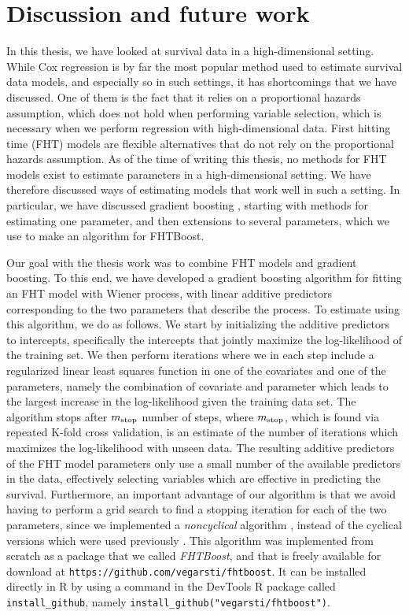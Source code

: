\chapter{Discussion and future work}
\label{sec:discussion}
In this thesis, we have looked at survival data in a high-dimensional setting.
While Cox regression is by far the most popular method used to estimate survival data models, and especially so in such settings, it has shortcomings that we have discussed.
One of them is the fact that it relies on a proportional hazards assumption, which does not hold when performing variable selection, which is necessary when we perform regression with high-dimensional data.
First hitting time (FHT) models are flexible alternatives that do not rely on the proportional hazards assumption.
As of the time of writing this thesis, no methods for FHT models exist to estimate parameters in a high-dimensional setting.
We have therefore discussed ways of estimating models that work well in such a setting.
In particular, we have discussed gradient boosting \citep{friedman2001}, starting with methods for estimating one parameter, and then extensions to several parameters, which we use to make an algorithm for FHTBoost.

Our goal with the thesis work was to combine FHT models and gradient boosting.
To this end, we have developed a gradient boosting algorithm for fitting an FHT model with Wiener process, with linear additive predictors corresponding to the two parameters that describe the process.
To estimate using this algorithm, we do as follows.
We start by initializing the additive predictors to intercepts, specifically the intercepts that jointly maximize the log-likelihood of the training set.
We then perform iterations where we in each step include a regularized linear least squares function in one of the covariates and one of the parameters, namely the combination of covariate and parameter which leads to the largest increase in the log-likelihood given the training data set.
The algorithm stops after $m_{\text{stop}}$ number of steps, where $m_{\text{stop}}$, which is found via repeated K-fold cross validation, is an estimate of the number of iterations which maximizes the log-likelihood with unseen data.
The resulting additive predictors of the FHT model parameters only use a small number of the available predictors in the data, effectively selecting variables which are effective in predicting the survival.
Furthermore, an important advantage of our algorithm is that we avoid having to perform a grid search to find a stopping iteration for each of the two parameters, since we implemented a \textit{noncyclical} algorithm \citep{thomas2018}, instead of the cyclical versions which were used previously \citep{schmid}.
This algorithm was implemented from scratch as a package that we called \textit{FHTBoost}, and that is freely available for download at \verb|https://github.com/vegarsti/fhtboost|.
It can be installed directly in R by using a command in the DevTools R package \citep{devtools} called \verb|install_github|, namely \verb|install_github("vegarsti/fhtboost")|.

